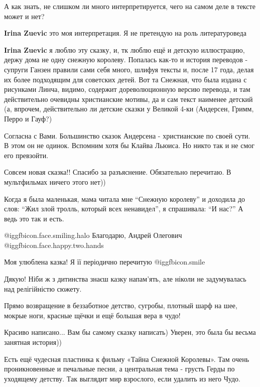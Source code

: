 \begin{itemize}
А как знать, не слишком ли много интерпретируется, чего на самом деле в тексте может и нет?

\begin{itemize} %
\textbf{Irina Zuevic} это моя интерпретация. Я не претендую на роль литературоведа

\textbf{Irina Zuevic} я люблю эту сказку, и, тк люблю ещё и детскую иллюстрацию, держу дома не одну снежную королеву. Попалась как-то и история переводов - супруги Ганзен правили сами себя много, шлифуя тексты и, после 17 года, делая их более подходящим для советских детей. Вот та Снежная, что была издана с рисунками Линча, видимо, содержит дореволюционную версию перевода, и там действительно очевидны христианские мотивы, да и сам текст наименее детский (а, впрочем, действительно ли детские сказки у Великой 4-ки (Андерсен, Гримм, Перро и Гауф?)

Согласна с Вами. Большинство сказок Андерсена - христианские по своей сути. В этом он не одинок. Вспомним хотя бы Клайва Льюиса. Но никто так и не смог его превзойти.
\end{itemize} %

Совсем новая сказка!! Спасибо за разъяснение. Обязательно перечитаю. В мультфильмах ничего этого нет))


Когда я была маленькая, мама читала мне \enquote{Снежную королеву} и доходила до слов:
\enquote{Жил злой тролль, который всех ненавидел}, я спрашивала: \enquote{И нас?} А ведь это
так и есть.


 @igg{fbicon.face.smiling.halo}  Благодарю, Андрей Олегович @igg{fbicon.face.happy.two.hands} 

Моя улюблена казка! Я її періодично перечитую  @igg{fbicon.smile} 

Дякую! Ніби ж з дитинства знаєш казку напам'ять, але ніколи не задумувалась над релігійністю сюжету.

Прямо возвращение в беззаботное детство, сугробы, плотный шарф на шее, мокрые ноги, красные щёчки и ещё большая вера в чудо!

Красиво написано... Вам бы самому сказку написать) Уверен, это была бы весьма занятная история))


Есть ещё чудесная пластинка к фильму «Тайна Снежной Королевы». Там очень
проникновенные и печальные песни, а центральная тема - грусть Герды по
уходящему детству. Так выглядит мир взрослого, если удалить из него Чудо.


\end{itemize}
